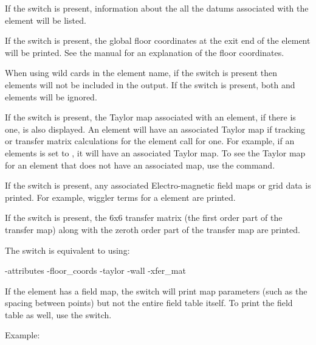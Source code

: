 {{{{{{{{If the  switch is present, information about the all the datums associated with the
element will be listed.

If the  switch is present, the global floor coordinates at the exit end of the
element will be printed. See the \bmad manual for an explanation of the floor coordinates.

When using wild cards in the element name, if the  switch is present then
 elements will not be included in the output. If the  switch is
present, both  and  elements will be ignored.

If the  switch is present, the Taylor map associated with an element, if there is one,
is also displayed. An element will have an associated Taylor map if tracking or transfer matrix
calculations for the element call for one. For example, if an elements  is set
to , it will have an associated Taylor map. To see the Taylor map for an element that
does not have an associated map, use the  command.

If the  switch is present, any associated Electro-magnetic field maps or grid data is
printed. For example, wiggler terms for a   element are printed.

If the  switch is present, the 6x6 transfer matrix (the first order part of the
transfer map) along with the zeroth order part of the transfer map are printed.

The  switch is equivalent to using:
\begin{example}
  -attributes
  -floor_coords
  -taylor
  -wall
  -xfer_mat
\end{example}
If the element has a field map, the  switch will print map parameters (such as the spacing between points) but
not the entire field table itself. To print the field table as well, use the  switch.

Example:


}}}}}}}}
